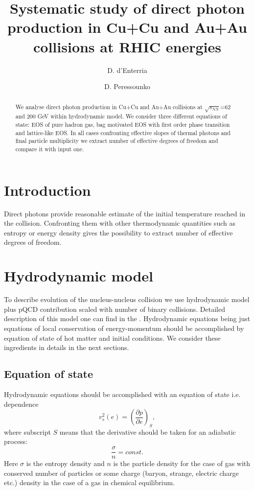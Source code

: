 \documentclass[aps,twocolumn,groupedaddress,superscriptaddress,floatfix]{revtex4}
\begin{document}
\title{Systematic study of direct photon production in Cu+Cu and Au+Au
collisions at RHIC energies}

\author{D. d'Enterria}
\author{D. Peressounko}
\begin{abstract}
We analyse direct photon production in Cu+Cu and Au+Au collisions
at $\sqrt{s_{NN}}$=62 and 200 GeV within hydrodynamic model. We
consider three different equations of state: EOS of pure hadron
gas, bag motivated EOS with first order phase transition and
lattice-like EOS.  In all cases confronting effective slopes of
thermal photons and final particle multiplicity we extract number
of effective degrees of freedom and compare it with input one.
\end{abstract}
\maketitle

\section{Introduction}
Direct photons provide reasonable estimate of the initial
temperature reached in the collision. Confronting them with other
thermodynamic quantities such as entropy or energy density gives
the possibility to extract number of effective degrees of freedom.

\section{Hydrodynamic model}
To describe evolution of the nucleus-nucleus collision we use
hydrodynamic model plus pQCD contribution scaled with number of
binary collisions. Detailed description of this model one can find
in the \cite{DDE-DP-1}. Hydrodynamic equations being just
equations of local conservation of energy-momentum should be
accomplished by equation of state of hot matter and initial
conditions. We consider these ingredients in details in the next
sections.


\subsection{Equation of state}

Hydrodynamic equations should be accomplished with an equation of
state i.e. dependence
\begin{equation}\label{vs-def}
v_s^2(e)= \left ( \frac{\partial p}{\partial e}\right )_{S},
\end{equation}
where subscript $S$ means that the derivative should be taken for
an adiabatic process:
$$
\frac{\sigma}{n}=const.
$$
Here $\sigma$ is the entropy density and $n$ is the particle
density for the case of gas with conserved number of particles or
some charge (baryon, strange, electric charge etc.) density in the
case of a gas in chemical equilibrium.
\end{document}
